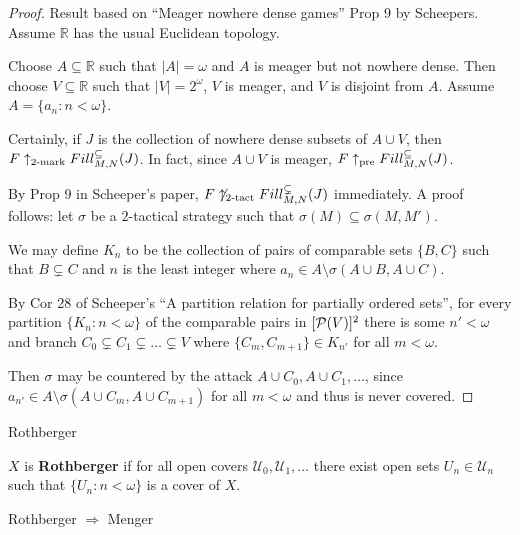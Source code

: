   \begin{proof}
    Result based on ``Meager nowhere dense games'' Prop 9 by Scheepers. Assume $\mathbb{R}$ has the usual Euclidean topology.

    Choose $A\subseteq\mathbb{R}$ such that $|A|=\omega$ and $A$ is meager but not nowhere dense. Then choose $V\subseteq\mathbb{R}$ such that $|V|=2^\omega$, $V$ is meager, and $V$ is disjoint from $A$. Assume $A=\{a_n:n<\omega\}$.

    Certainly, if $J$ is the collection of nowhere dense subsets of $A\cup V$, then $F\uparrow_{2\text{-mark}}Fill^{\subseteq}_{M,N}(J)$. In fact, since $A\cup V$ is meager, $F\uparrow_{\text{pre}}Fill^{\subseteq}_{M,N}(J)$. 

    By Prop 9 in Scheeper's paper, $F\not\uparrow_{2\text{-tact}}Fill^{\subsetneq}_{M,N}(J)$ immediately. A proof follows: let $\sigma$ be a $2$-tactical strategy such that $\sigma(M)\subseteq\sigma(M,M')$.

    We may define $K_n$ to be the collection of pairs of comparable sets $\{B,C\}$ such that $B\subsetneq C$ and $n$ is the least integer where $a_n \in A \setminus \sigma(A\cup B,A\cup C)$.

    By Cor 28 of Scheeper's ``A partition relation for partially ordered sets'', for every partition $\{K_n:n<\omega\}$ of the comparable pairs in $[\mathcal{P}(V)]^2$ there is some $n'<\omega$ and branch $C_0\subsetneq C_1\subsetneq \dots\subsetneq V$ where $\{C_m,C_{m+1}\}\in K_{n'}$ for all $m<\omega$.

    Then $\sigma$ may be countered by the attack $A\cup C_0, A\cup C_1, \dots$, since $a_{n'} \in A \setminus \sigma(A\cup C_m,A\cup C_{m+1})$ for all $m<\omega$ and thus is never covered.
  \end{proof}

















\newpage

  \centerline{Rothberger}

  \begin{definition}
    $X$ is \textbf{Rothberger} if for all open covers $\mathcal{U}_0,\mathcal{U}_1,\dots$ there exist open sets $U_n\in \mathcal{U}_n$ such that $\{U_n:n<\omega\}$ is a cover of $X$.
  \end{definition}

  \begin{proposition}
    Rothberger $\Rightarrow$ Menger
  \end{proposition}

